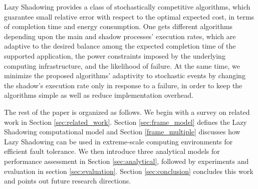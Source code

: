 Lazy Shadowing provides a class of stochastically competitive algorithms, which guarantee small relative error with respect to the optimal expected cost, in terms of completion time and energy consumption. One gets different algorithms depending upon the main and shadow processes' execution rates, which are adaptive to the desired balance among the expected completion time of the supported application, the power constraints imposed by the underlying computing infrastructure, and the likelihood of failure. At the same time, we minimize the proposed algorithms' adaptivity to stochastic events by changing the shadow's execution rate only in response to a failure, in order to keep the algorithms simple as well as reduce implementation overhead. 



The rest of the paper is organized as follows. We begin with a survey on related work in Section 
\ref{sec:related_work}. Section \ref{sec:frame_model} defines the Lazy Shadowing 
computational model and Section \ref{frame_multiple} discusses how Lazy Shadowing can be used in 
extreme-scale computing environments for efficient fault tolerance. 
We then introduce three analytical models for performance assessment
in Section \ref{sec:analytical}, 
followed by experiments and evaluation in
section \ref{sec:evaluation}. Section \ref{sec:conclusion} concludes this work and points out 
future research directions.